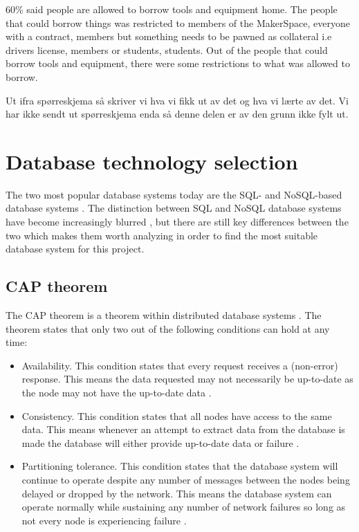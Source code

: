 60\% said people are allowed to borrow tools and equipment home. The people that could borrow things was restricted to members of the MakerSpace, everyone with a contract, members but something needs to be pawned as collateral i.e drivers license, members or students, students. 
Out of the people that could borrow tools and equipment, there were some restrictions to what was allowed to borrow.



Ut ifra spørreskjema så skriver vi hva vi fikk ut av det og hva vi lærte av det. Vi har ikke sendt ut spørreskjema enda så denne delen er av den grunn ikke fylt ut.

\section{Database technology selection}
The two most popular database systems today are the SQL- and NoSQL-based database systems \cite{stackoverflow-db-statistics}.
The distinction between SQL and NoSQL database systems have become increasingly blurred \cite{sql-vs-nosql}, but there are still key differences between the two which makes them worth analyzing in order to find the most suitable database system for this project.

\iffalse
\subsection{CAP theorem}
The CAP theorem is a theorem within distributed database systems \cite{sql-schema}.
The theorem states that only two out of the following conditions can hold at any time:
\begin{itemize}
    \item Availability.
    This condition states that every request receives a (non-error) response.
    This means the data requested may not necessarily be up-to-date as the node may not have the up-to-date data \cite{sql-schema}.
    \item Consistency.
    This condition states that all nodes have access to the same data.
    This means whenever an attempt to extract data from the database is made the database will either provide up-to-date data or failure \cite{sql-schema}.
    \item Partitioning tolerance.
    This condition states that the database system will continue to operate despite any number of messages between the nodes being delayed or dropped by the network.
    This means the database system can operate normally while sustaining any number of network failures so long as not every node is experiencing failure \cite{sql-schema}.
\end{itemize}

